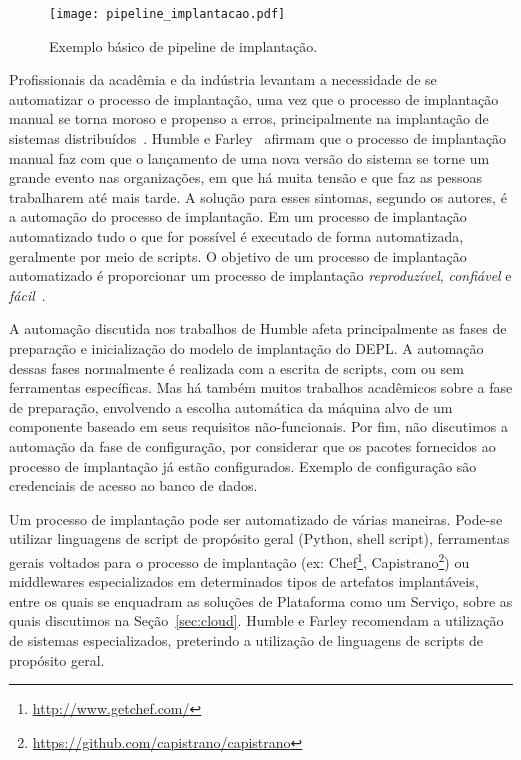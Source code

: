 \begin{figure}[!h]
  \centering
  \texttt{[image: pipeline\_implantacao.pdf]} 
  \caption{Exemplo básico de pipeline de implantação.}
  \label{fig:pipeline_implantacao} 
\end{figure}

Profissionais da acadêmia e da indústria levantam a necessidade de se automatizar o processo de implantação, uma vez que o processo de implantação manual se torna moroso e propenso a erros, principalmente na implantação de sistemas distribuídos~\cite{Humble2011Continuous,Dolstra2005Configuration}. 
Humble e Farley~\cite{Humble2011Continuous} afirmam que o processo de implantação manual faz com que  
o lançamento de uma nova versão do sistema se torne um grande evento nas organizações, 
em que há muita tensão e que faz as pessoas trabalharem até mais tarde.
A solução para esses sintomas, segundo os autores, é a automação do processo de implantação.
Em um processo de implantação automatizado tudo o que for possível é executado de forma automatizada,
geralmente por meio de scripts. O objetivo de um processo de implantação automatizado
é proporcionar um processo de implantação \emph{reproduzível}, \emph{confiável} e \emph{fácil}~\cite{Humble2011Continuous}.

A automação discutida nos trabalhos de Humble afeta principalmente as fases de preparação e inicialização do modelo de implantação do DEPL. A automação dessas fases normalmente é realizada com a escrita de scripts, com ou sem ferramentas específicas. Mas há também muitos trabalhos acadêmicos sobre a fase de preparação, envolvendo a escolha automática da máquina alvo de um componente baseado em seus requisitos não-funcionais. Por fim, não discutimos a automação da fase de configuração, por considerar que os pacotes fornecidos ao processo de implantação já estão configurados. Exemplo de configuração são credenciais de acesso ao banco de dados.

Um processo de implantação pode ser automatizado de várias maneiras.
Pode-se utilizar linguagens de script de propósito geral (Python, shell script),
ferramentas gerais voltados para o processo de implantação (ex: 
Chef\footnote{\url{http://www.getchef.com/}}, Capistrano\footnote{\url{https://github.com/capistrano/capistrano}})
ou middlewares especializados em determinados tipos de artefatos implantáveis,
entre os quais se enquadram as soluções de Plataforma como um Serviço,
sobre as quais discutimos na Seção~\ref{sec:cloud}.
Humble e Farley recomendam a utilização de sistemas especializados, preterindo 
a utilização de linguagens de scripts de propósito geral.

